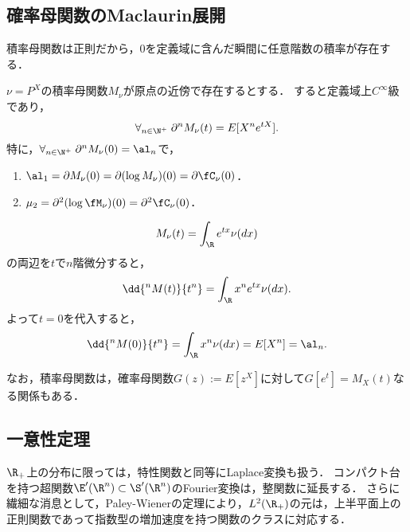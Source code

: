 \documentclass[uplatex,dvipdfmx]{jsreport}
\begin{document}
\subsection{確率母関数のMaclaurin展開}

\begin{tcolorbox}[colframe=ForestGreen, colback=ForestGreen!10!white,breakable,colbacktitle=ForestGreen!40!white,coltitle=black,fonttitle=\bfseries\sffamily,
    title=]
    積率母関数は正則だから，$0$を定義域に含んだ瞬間に任意階数の積率が存在する．
\end{tcolorbox}

\begin{theorem}[マクローリン展開係数は積率である]
    $\nu=P^X$の積率母関数$M_\nu$が原点の近傍で存在するとする．
    すると定義域上$C^\infty$級であり，
    \[\forall_{n\in\N^+}\;\partial^nM_\nu(t)=E[X^ne^{tX}].\]
    特に，$\forall_{n\in\N^+}\;\partial^nM_\nu(0)=\al_n$で，
    \begin{enumerate}
        \item $\al_1=\partial M_\nu(0)=\partial(\log M_\nu)(0)=\partial\fC_\nu(0)$．
        \item $\mu_2=\partial^2(\log\fM_\nu)(0)=\partial^2\fC_\nu(0)$．
    \end{enumerate}
\end{theorem}
\begin{Proof}
    \[M_\nu(t)=\int_\R e^{tx}\nu(dx)\]
    の両辺を$t$で$n$階微分すると，
    \[\dd{^nM(t)}{t^n}=\int_\R x^ne^{tx}\nu(dx).\]
    よって$t=0$を代入すると，
    \[\dd{^nM(0)}{t^n}=\int_\R x^n\nu(dx)=E[X^n]=\al_n.\]
\end{Proof}

\begin{remark}[確率母関数との関係]
    なお，積率母関数は，確率母関数$G(z):=E[z^X]$に対して$G[e^t]=M_X(t)$なる関係もある．
\end{remark}

\subsection{一意性定理}

\begin{tcolorbox}[colframe=ForestGreen, colback=ForestGreen!10!white,breakable,colbacktitle=ForestGreen!40!white,coltitle=black,fonttitle=\bfseries\sffamily,
title=]
    $\R_+$上の分布に限っては，特性関数と同等にLaplace変換も扱う．
    コンパクト台を持つ超関数$\E'(\R^n)\subset\S'(\R^n)$のFourier変換は，整関数に延長する．
    さらに繊細な消息として，Paley-Wienerの定理により，$L^2(\R_+)$の元は，上半平面上の正則関数であって指数型の増加速度を持つ関数のクラスに対応する．
\end{tcolorbox}
\end{document}
